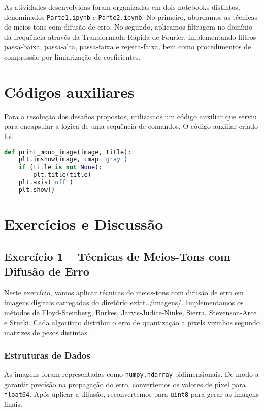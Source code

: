 \documentclass[12pt,a4paper]{article}
\begin{document}
As atividades desenvolvidas foram organizadas em dois notebooks distintos, denominados \texttt{Parte1.ipynb} e \texttt{Parte2.ipynb}. No primeiro, abordamos as técnicas de meios-tons com difusão de erro. No segundo, aplicamos filtragem no domínio da frequência através da Transformada Rápida de Fourier, implementando filtros passa-baixa, passa-alta, passa-faixa e rejeita-faixa, bem como procedimentos de compressão por limiarização de coeficientes.

\section{Códigos auxiliares}
Para a resolução dos desafios propostos, utilizamos um código auxiliar que serviu para encapsular a lógica de uma sequência de comandos. O código auxiliar criado foi:

\begin{lstlisting}[language=Python, caption={Funções auxiliares para visualização de imagens}]
def print_mono_image(image, title):
    plt.imshow(image, cmap='gray')
    if (title is not None):
        plt.title(title)
    plt.axis('off')
    plt.show()
\end{lstlisting}

\section{Exercícios e Discussão}

\subsection{Exercício 1 – Técnicas de Meios-Tons com Difusão de Erro}

Neste exercício, vamos aplicar técnicas de meios-tons com difusão de erro em imagens digitais carregadas do diretório exttt{../imagens/}. Implementamos os métodos de Floyd-Steinberg, Burkes, Jarvis-Judice-Ninke, Sierra, Stevenson-Arce e Stucki. Cada algoritmo distribui o erro de quantização a pixels vizinhos segundo matrizes de pesos distintas.

\subsubsection*{Estruturas de Dados}
As imagens foram representadas como \texttt{numpy.ndarray} bidimensionais. De modo a garantir precisão na propagação do erro, convertemos os valores de pixel para \texttt{float64}. Após aplicar a difusão, reconvertemos para \texttt{uint8} para gerar as imagens finais.
\end{document}
